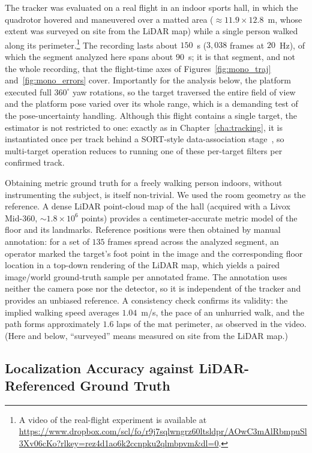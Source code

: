 The tracker was evaluated on a real flight in an indoor sports hall, in which the
quadrotor hovered and maneuvered over a matted area ($\approx 11.9\times12.8$~m,
whose extent was surveyed on site from the LiDAR map) while a single person walked along its
perimeter.\footnote{A video of the real-flight experiment is available at
\url{https://www.dropbox.com/scl/fo/r9j7sqlwngrz60ltsldpr/AOwC3mAlRbmpuSl3Xv06cKo?rlkey=rez4d1ao6k2ccnpku2qlmbpvm&dl=0}.}
The recording lasts
about $150$~s ($3{,}038$ frames at $20$~Hz), of which the segment analyzed here
spans about $90$~s; it is that segment, and not the whole recording, that the
flight-time axes of Figures~\ref{fig:mono_traj} and~\ref{fig:mono_errors} cover.
Importantly for the analysis below, the platform executed full
$360^\circ$ yaw rotations, so the target traversed the entire field of view and
the platform pose varied over its whole range, which is a demanding test of the
pose-uncertainty handling. Although this flight contains a single target, the
estimator is not restricted to one: exactly as in Chapter~\ref{cha:tracking}, it
is instantiated once per track behind a SORT-style data-association
stage~\cite{bewley2016sort}, so multi-target operation reduces to running one of
these per-target filters per confirmed track.

Obtaining metric ground truth for a freely walking person indoors, without
instrumenting the subject, is itself non-trivial. We used the room geometry as
the reference. A dense LiDAR point-cloud map of the hall (acquired with a
Livox Mid-360, $\sim 1.8\times10^{6}$ points) provides a centimeter-accurate
metric model of the floor and its landmarks. Reference positions were then
obtained by manual annotation: for a set of $135$ frames spread across the
analyzed segment, an operator marked the target's foot point in the image and the
corresponding floor location in a top-down rendering of the LiDAR map, which
yields a paired image/world ground-truth sample per annotated frame. The
annotation uses neither the camera pose nor the detector, so it is independent of
the tracker and provides an unbiased reference. A consistency check confirms its
validity: the implied walking speed averages $1.04$~m/s, the pace of an unhurried
walk, and the path forms approximately $1.6$ laps of the mat perimeter, as
observed in the video. (Here and below, ``surveyed'' means measured on site from
the LiDAR map.)

\subsection{Localization Accuracy against LiDAR-Referenced Ground Truth}
\label{sec:mono_accuracy}

